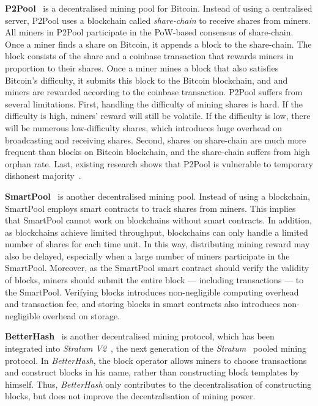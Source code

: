 \textbf{P2Pool}~\cite{voight2011p2pool} is a decentralised mining pool for Bitcoin.
Instead of using a centralised server, P2Pool uses a blockchain called \emph{share-chain} to receive shares from miners.
All miners in P2Pool participate in the PoW-based consensus of share-chain.
Once a miner finds a share on Bitcoin, it appends a block to the share-chain.
The block consists of the share and a coinbase transaction that rewards miners in proportion to their shares.
Once a miner mines a block that also satisfies Bitcoin's difficulty, it submits this block to the Bitcoin blockchain, and and miners are rewarded according to the coinbase transaction.
P2Pool suffers from several limitations.
First, handling the difficulty of mining shares is hard.
If the difficulty is high, miners' reward will still be volatile.
If the difficulty is low, there will be numerous low-difficulty shares, which introduces huge overhead on broadcasting and receiving shares.
Second, shares on share-chain are much more frequent than blocks on Bitcoin blockchain, and the share-chain suffers from high orphan rate.
Last, existing research shows that P2Pool is vulnerable to temporary dishonest majority~\cite{decentralised-mining-pool-security}.

\textbf{SmartPool}~\cite{luu2017smartpool} is another decentralised mining pool.
Instead of using a blockchain, SmartPool employs smart contracts to track shares from miners.
This implies that SmartPool cannot work on blockchains without smart contracts.
In addition, as blockchains achieve limited throughput, blockchains can only handle a limited number of shares for each time unit.
In this way, distributing mining reward may also be delayed, especially when a large number of miners participate in the SmartPool.
Moreover, as the SmartPool smart contract should verify the validity of blocks, miners should submit the entire block --- including transactions --- to the SmartPool.
Verifying blocks introduces non-negligible computing overhead and transaction fee, and storing blocks in smart contracts also introduces non-negligible overhead on storage.



\textbf{BetterHash}~\cite{draft-bip-BetterHash} is another decentralised mining protocol, which has been integrated into \emph{Stratum V2}~\cite{stratum-v2}, the next generation of the \textit{Stratum}~\cite{stratum} pooled mining protocol.
In \textit{BetterHash}, the block operator allows miners to choose transactions and construct blocks in his name, rather than constructing block templates by himself.
Thus, \textit{BetterHash} only contributes to the decentralisation of constructing blocks, but does not improve the decentralisation of mining power.